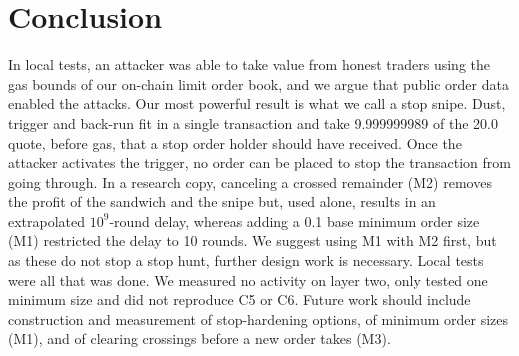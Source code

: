 \section{Conclusion}\label{sec:conclusion}
In local tests, an attacker was able to take value from honest traders using the gas bounds of our on-chain limit order book, and we argue that public order data enabled the attacks. %
Our most powerful result is what we call a stop snipe. Dust, trigger and back-run fit in a single transaction and take 9.999999989 of the 20.0 quote, before gas, that a stop order holder should have received. %
Once the attacker activates the trigger, no order can be placed to stop the transaction from going through. %
In a research copy, canceling a crossed remainder (M2) removes the profit of the sandwich and the snipe but, used alone, results in an extrapolated $10^{9}$-round delay, whereas adding a 0.1 base minimum order size (M1) restricted the delay to 10 rounds. %
We suggest using M1 with M2 first, but as these do not stop a stop hunt, further design work is necessary. %
Local tests were all that was done. We measured no activity on layer two, only tested one minimum size and did not reproduce C5 or C6. %
Future work should include construction and measurement of stop-hardening options, of minimum order sizes (M1), and of clearing crossings before a new order takes (M3). %
